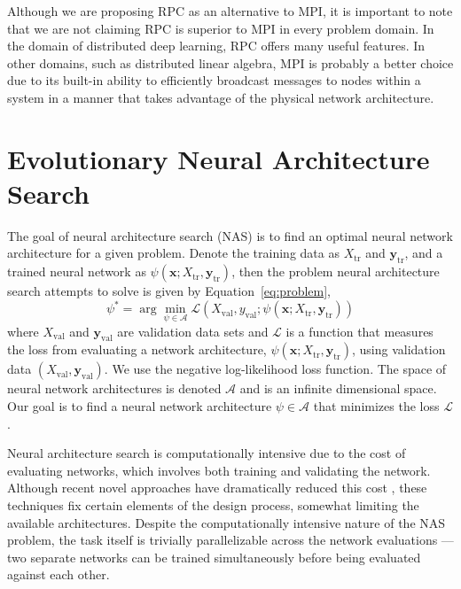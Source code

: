 \documentclass[conference]{IEEEtran}
\begin{document}
Although we are proposing RPC as an alternative to MPI, it is important to note
that we are not claiming RPC is superior to MPI in every problem domain. In the
domain of distributed deep learning, RPC offers many useful features. In other
domains, such as distributed linear algebra, MPI is probably a better choice due
to its built-in ability to efficiently broadcast messages to nodes within a
system in a manner that takes advantage of the physical network architecture.

\section{Evolutionary Neural Architecture Search}
The goal of neural architecture search (NAS) is to find an optimal neural
network architecture for a given problem. Denote the training data as
$X_{\text{tr}}$ and $\mathbf{y}_{\text{tr}}$, and a trained neural network as
$\psi(\mathbf{x}; X_{\text{tr}}, \mathbf{y}_{\text{tr}})$, then the problem
neural architecture search attempts to solve is given by
Equation~\eqref{eq:problem},
\begin{equation}\label{eq:problem}
\psi^* = \arg\min_{\psi \in \mathcal{A}} \mathcal{L}(X_{\text{val}}, y_{\text{val}}; \psi(\mathbf{x}; X_{\text{tr}}, \mathbf{y}_{\text{tr}}))
\end{equation}
where $X_{\text{val}}$ and $\mathbf{y}_{\text{val}}$ are validation data sets and
$\mathcal{L}$ is a function that measures the loss from evaluating a network
architecture, $\psi(\mathbf{x}; X_{\text{tr}}, \mathbf{y}_{\text{tr}})$, using
validation data $(X_{\text{val}}, \mathbf{y}_{\text{val}})$. We use the negative
log-likelihood loss function. The space of neural network architectures is
denoted $\mathcal{A}$ and is an infinite dimensional space. Our goal is to find
a neural network architecture $\psi \in \mathcal{A}$ that minimizes the loss
$\mathcal{L}$.

Neural architecture search is computationally intensive due to the cost of
evaluating networks, which involves both training and validating the network.
Although recent novel approaches have dramatically reduced this cost
\cite{DBLP:journals/corr/abs-1708-05344, pmlr-v80-pham18a}, these techniques fix
certain elements of the design process, somewhat limiting the available
architectures. Despite the computationally intensive nature of the NAS problem,
the task itself is trivially parallelizable across the network evaluations ---
two separate networks can be trained simultaneously before being evaluated
against each other.
\end{document}
